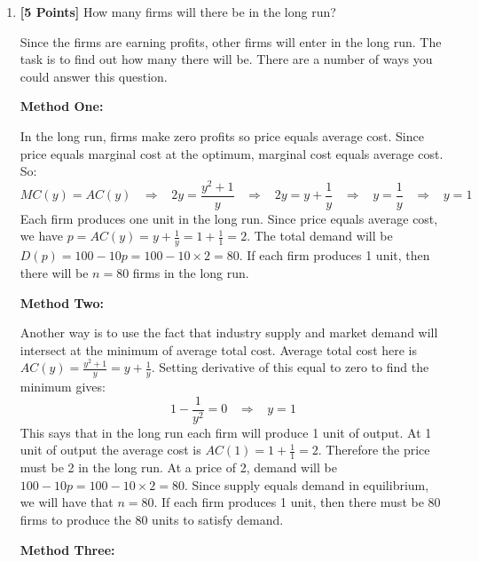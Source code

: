 \documentclass[12pt]{article}
\newcounter{question}[section]
\newenvironment{subquestions}{
  \begin{enumerate}[label=(\roman*)]}{\end{enumerate}}
\begin{document}
\begin{subquestions}
    \textcolor{solution-color}{
      Each firm will earn revenues of $p\times y= 4 \times 2 = 8$. The cost is $c\left( y \right)=y^2+1 = 2^2 + 1 = 4+1 = 5$. The profits are therefore $8-5=3$.
     }
  \item \textbf{[5 Points]} How many firms will there be in the long run?

    \textcolor{solution-color}{
      Since the firms are earning profits, other firms will enter in the long run. The task is to find out how many there will be. There are a number of ways you could answer this question.
    }\par\textcolor{solution-color}{
      \textbf{Method One:}
    }\par\textcolor{solution-color}{
      In the long run, firms make zero profits so price equals average cost. Since price equals marginal cost at the optimum, marginal cost equals average cost. So:
      \[
        MC\left( y \right)=AC\left( y \right) \;\;\;\Longrightarrow \;\;\;
        2y = \frac{y^2+1}{y} \;\;\; \Longrightarrow \;\;\;
        2y = y + \frac{1}{y} \;\;\; \Longrightarrow \;\;\;
        y=\frac{1}{y}\;\;\; \Longrightarrow \;\;\;
        y=1
    \]
    Each firm produces one unit in the long run. Since price equals average cost, we have $p=AC\left( y \right)=y+\frac{1}{y}=1+\frac{1}{1}=2$. The total demand will be $D\left( p \right)=100-10p=100-10\times 2 = 80$. If each firm produces 1 unit, then there will be $n=80$ firms in the long run.
    }\par\textcolor{solution-color}{
      \textbf{Method Two:}
    }\par\textcolor{solution-color}{
      Another way is to use the fact that industry supply and market demand will intersect at the minimum of average total cost. Average total cost here is $AC\left( y \right)=\frac{y^2+1}{y}=y+\frac{1}{y}$. Setting derivative of this equal to zero to find the minimum gives:
      \[1-\frac{1}{y^2}=0 \;\;\;\Longrightarrow \;\;\; y=1
      \]
      This says that in the long run each firm will produce 1 unit of output. At 1 unit of output  the average cost is $AC\left( 1 \right)=1+\frac{1}{1}=2$. Therefore the price must be 2 in the long run. At a price of 2, demand will be $100-10p=100-10\times 2 = 80$. Since supply equals demand in equilibrium, we will have that $n=80$. If each firm produces 1 unit, then there must be 80 firms to produce the 80 units to satisfy demand.
    }\par\textcolor{solution-color}{
      \textbf{Method Three:}
    }\par\textcolor{solution-color}{
}
\end{subquestions}
\end{document}
